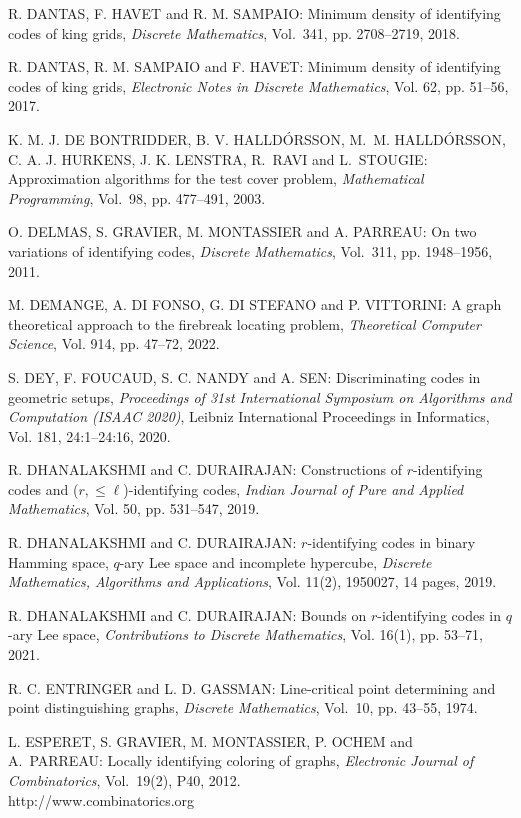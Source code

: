 \begin{thebibliography}{999}
R. DANTAS, F. HAVET and R. M. SAMPAIO: Minimum density of identifying codes of king grids, {\it Discrete Mathematics}, Vol.~341, pp. 2708--2719, 2018.

R. DANTAS, R. M. SAMPAIO and F. HAVET: Minimum density of identifying codes of king grids, {\it Electronic Notes in Discrete Mathematics}, Vol. 62, pp. 51--56, 2017.

K. M. J. DE BONTRIDDER, B. V. HALLD\'ORSSON, M.~M. HALL\-D\'ORS\-SON, C. A. J. HURKENS, J. K. LENSTRA, R.~RAVI and L.~STOU\-GIE: Approximation algorithms for the test cover problem, {\it Mathematical Programming}, Vol.~98, pp. 477--491, 2003.

O. DELMAS, S. GRAVIER, M. MONTASSIER and A. PARREAU: On two variations of identifying codes, {\it Discrete Mathematics}, Vol.~311, pp. 1948--1956, 2011.

M. DEMANGE, A. DI FONSO, G. DI STEFANO and P. VITTORINI: A graph theoretical approach to the firebreak locating problem, {\it Theoretical Computer Science}, Vol. 914, pp. 47--72, 2022.

S. DEY, F. FOUCAUD, S. C. NANDY and A. SEN: Discriminating codes in geometric setups, {\it Proceedings of 31st International Symposium on Algorithms and Computation (ISAAC 2020)}, Leibniz International Proceedings in Informatics, Vol. 181, 24:1--24:16, 2020.

R. DHANALAKSHMI and C. DURAIRAJAN: Constructions of $r$-identifying codes and ($r,\leq \ell$)-identifying codes, {\it Indian Journal of Pure and Applied Mathematics}, Vol. 50, pp. 531--547, 2019.

R. DHANALAKSHMI and C. DURAIRAJAN: $r$-identifying codes in binary Hamming space, $q$-ary Lee space and incomplete hypercube, {\it Discrete Mathematics, Algorithms and Applications}, Vol. 11(2), 1950027, 14 pages, 2019.

R. DHANALAKSHMI and C. DURAIRAJAN: Bounds on $r$-identifying codes in $q$-ary Lee space, {\it Contributions to Discrete Mathematics}, Vol. 16(1), pp. 53--71, 2021.

R. C. ENTRINGER and L. D. GASSMAN: Line-critical point determining and point distinguishing graphs, {\it Discrete Mathematics}, Vol.~10, pp. 43--55, 1974.

L. ESPERET, S. GRAVIER, M. MONTASSIER, P. OCHEM and A.~PARREAU: Locally identifying coloring of graphs, {\it Electronic Journal of Combinatorics}, Vol.~19(2), P40, 2012.\\
http://www.combinatorics.org


\end{thebibliography}
